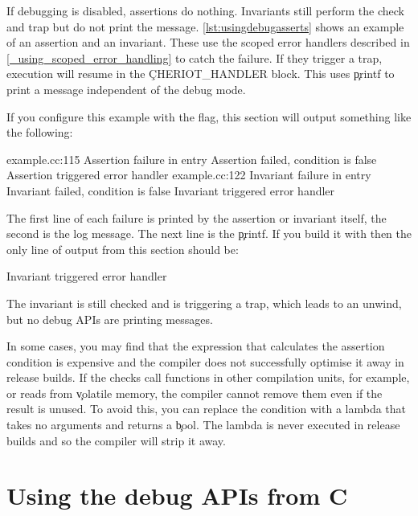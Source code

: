 {If debugging is disabled, assertions do nothing.
Invariants still perform the check and trap but do not print the message.
\ref{lst:usingdebugasserts} shows an example of an assertion and an invariant.
These use the scoped error handlers described in \ref{_using_scoped_error_handling} to catch the failure.
If they trigger a trap, execution will resume in the \c{CHERIOT_HANDLER} block.
This uses \c{printf} to print a message independent of the debug mode.

\codelisting[filename=examples/debug_helpers/example.cc,marker=asserts,label=lst:usingdebugasserts,caption="Assertions and invariants with the debugging APIs."]{}

If you configure this example with the  flag, this section will output something like the following:

\begin{console}
example.cc:115 Assertion failure in entry
Assertion failed, condition is false
Assertion triggered error handler
example.cc:122 Invariant failure in entry
Invariant failed, condition is false
Invariant triggered error handler
\end{console}

The first line of each failure is printed by the assertion or invariant itself, the second is the log message.
The next line is the \c{printf}.
If you build it with  then the only line of output from this section should be:

\begin{console}
Invariant triggered error handler
\end{console}

The invariant is still checked and is triggering a trap, which leads to an unwind, but no debug APIs are printing messages.

In some cases, you may find that the expression that calculates the assertion condition is expensive and the compiler does not successfully optimise it away in release builds.
If the checks call functions in other compilation units, for example, or reads from \c{volatile} memory, the compiler cannot remove them even if the result is unused.
To avoid this, you can replace the condition with a lambda that takes no arguments and returns a \c{bool}.
The lambda is never executed in release builds and so the compiler will strip it away.

\section{Using the debug APIs from C}

}
